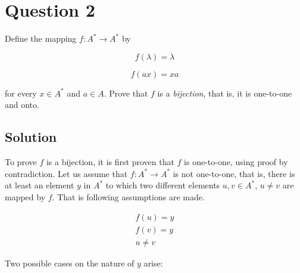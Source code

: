 
\section*{Question 2}

Define the mapping $f:A^*\rightarrow A^*$ by

\begin{equation}\label{assum1}
f(\lambda)=\lambda
\end{equation}

\begin{equation}\label{assum2}
f(ax)=xa
\end{equation}

for every $x \in A^*$ and $a \in A$.
Prove that $f$ is a \textit{bijection}, that is, it is one-to-one and onto.

\subsection*{Solution}

To prove $f$ is a bijection, it is first proven that $f$ is one-to-one, using proof by contradiction.
Let us assume that $f: A^* \rightarrow A^*$ is not one-to-one, that is, there is at least an element $y$ in $A^*$ to which two different elements $u, v \in A^*$, $u \neq v$ are mapped by $f$.
That is following assumptions are made.

\begin{eqnarray}
f(u) = y \label{assum3} \\
f(v) = y \label{assum4} \\
u \neq v \label{assum5}
\end{eqnarray}

Two possible cases on the nature of $y$ arise:

